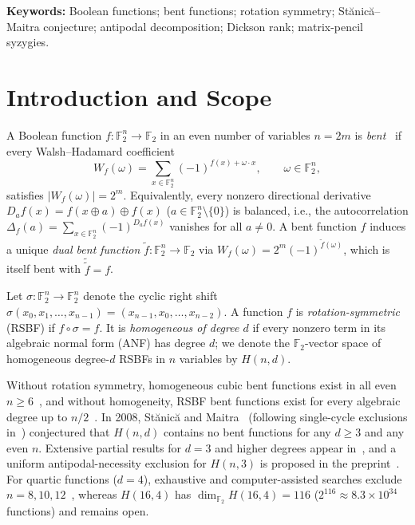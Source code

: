 \documentclass[11pt,a4paper]{article}
\theoremstyle{definition}
\newcommand{\F}{\mathbb{F}_2}
\begin{document}
\noindent\textbf{Keywords:} Boolean functions; bent functions; rotation symmetry; St\u{a}nic\u{a}--Maitra conjecture; antipodal decomposition; Dickson rank; matrix-pencil syzygies.

\section{Introduction and Scope}
\label{sec:intro}

A Boolean function $f:\F^n \to \F$ in an even number of variables $n = 2m$ is \emph{bent}~\cite{rothaus,carlet_book,mesnager_book} if every Walsh--Hadamard coefficient
\[
  W_f(\omega) = \sum_{x \in \F^n} (-1)^{f(x) + \omega \cdot x}, \qquad \omega \in \F^n,
\]
satisfies $|W_f(\omega)| = 2^m$. Equivalently, every nonzero directional derivative $D_a f(x) = f(x \oplus a) \oplus f(x)$ ($a \in \F^n \setminus \{0\}$) is balanced, i.e., the autocorrelation $\Delta_f(a) = \sum_{x \in \F^n} (-1)^{D_a f(x)}$ vanishes for all $a \neq 0$. A bent function $f$ induces a unique \emph{dual bent function} $\tilde{f}:\F^n \to \F$ via $W_f(\omega) = 2^m (-1)^{\tilde{f}(\omega)}$, which is itself bent with $\tilde{\tilde{f}} = f$.

Let $\sigma:\F^n \to \F^n$ denote the cyclic right shift $\sigma(x_0, x_1, \dots, x_{n-1}) = (x_{n-1}, x_0, \dots, x_{n-2})$. A function $f$ is \emph{rotation-symmetric} (RSBF) if $f \circ \sigma = f$. It is \emph{homogeneous of degree $d$} if every nonzero term in its algebraic normal form (ANF) has degree $d$; we denote the $\F$-vector space of homogeneous degree-$d$ RSBFs in $n$ variables by $H(n,d)$.

Without rotation symmetry, homogeneous cubic bent functions exist in all even $n \ge 6$~\cite{charnes2002}, and without homogeneity, RSBF bent functions exist for every algebraic degree up to $n/2$~\cite{sutang}. In 2008, St\u{a}nic\u{a} and Maitra~\cite{stanica} (following single-cycle exclusions in~\cite{stanica2004}) conjectured that $H(n,d)$ contains no bent functions for any $d \ge 3$ and any even $n$. Extensive partial results for $d=3$ and higher degrees appear in~\cite{meng2007,meng,zhang,gao2012,cusick,sun}, and a uniform antipodal-necessity exclusion for $H(n,3)$ is proposed in the preprint~\cite{vono_cubic}. For quartic functions ($d=4$), exhaustive and computer-assisted searches exclude $n=8, 10, 12$~\cite{vono_h12}, whereas $H(16,4)$ has $\dim_{\F} H(16,4) = 116$ ($2^{116} \approx 8.3 \times 10^{34}$ functions) and remains open.
\end{document}
